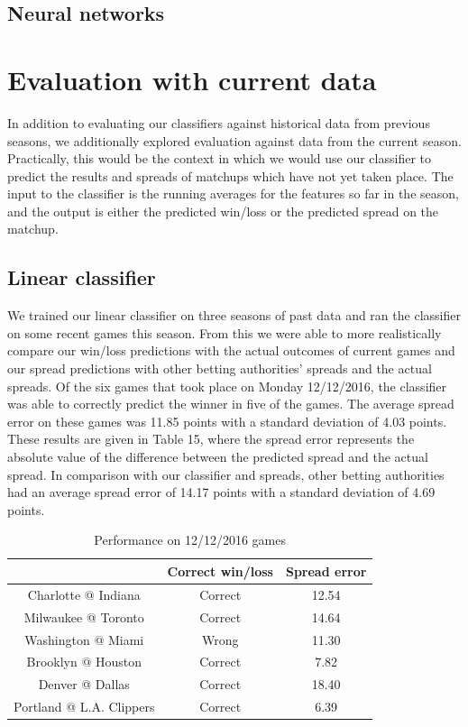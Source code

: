 \documentclass{article}
\begin{document}
\subsection{Neural networks}


\section{Evaluation with current data}
In addition to evaluating our classifiers against historical data from previous seasons, we additionally explored evaluation against data from the current season. Practically, this would be the context in which we would use our classifier to predict the results and spreads of matchups which have not yet taken place. The input to the classifier is the running averages for the features so far in the season, and the output is either the predicted win/loss or the predicted spread on the matchup.

\subsection{Linear classifier}
We trained our linear classifier on three seasons of past data and ran the classifier on some recent games this season. From this we were able to more realistically compare our win/loss predictions with the actual outcomes of current games and our spread predictions with other betting authorities' spreads and the actual spreads. Of the six games that took place on Monday 12/12/2016, the classifier was able to correctly predict the winner in five of the games. The average spread error on these games was 11.85 points with a standard deviation of 4.03 points. These results are given in Table 15, where the spread error represents the absolute value of the difference between the predicted spread and the actual spread. In comparison with our classifier and spreads, other betting authorities had an average spread error of 14.17 points with a standard deviation of 4.69 points.

\begin{table}
  \begin{center}
    \begin{tabular}{ | c | c | c | }
      \hline
                                & Correct win/loss     & Spread error  \\ \hline
      Charlotte @ Indiana       & Correct              & 12.54    \\ \hline
      Milwaukee @ Toronto       & Correct              & 14.64    \\ \hline
      Washington @ Miami        & Wrong                & 11.30     \\ \hline
      Brooklyn @ Houston        & Correct              & 7.82      \\ \hline
      Denver @ Dallas           & Correct              & 18.40    \\ \hline
      Portland @ L.A. Clippers  & Correct              & 6.39    \\ \hline
    \end{tabular}
  \end{center}
  \caption{Performance on 12/12/2016 games}
\end{table}
\end{document}
